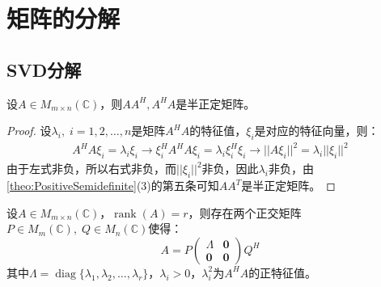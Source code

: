 \section{矩阵的分解}

\subsection{SVD分解}
\begin{theorem}\label{theo:AATPositiveSemidefinite}
	设$A\in M_{m\times n}(\mathbb{C})$，则$AA^H,A^HA$是半正定矩阵。
\end{theorem}
\begin{proof}
	设$\lambda_i,\;i=1,2,\dots,n$是矩阵$A^HA$的特征值，$\xi_i$是对应的特征向量，则：
	\begin{align*}
		A^HA\xi_i=\lambda_i\xi_i\rightarrow
		\xi_i^HA^HA\xi_i=\lambda_i\xi_i^H\xi_i\rightarrow
		||A\xi_i||^2=\lambda_i||\xi_i||^2
	\end{align*}
	由于左式非负，所以右式非负，而$||\xi_i||^2$非负，因此$\lambda_i$非负，由\cref{theo:PositiveSemidefinite}(3)的第五条可知$AA^T$是半正定矩阵。
\end{proof}
\begin{theorem}\label{theo:SVD}
	设$A\in M_{m\times n}(\mathbb{C})$，$\operatorname{rank}(A)=r$，则存在两个正交矩阵$P\in M_{m}(\mathbb{C}),\;Q\in M_{n}(\mathbb{C})$使得：
	\begin{equation*}
		A=P
		\begin{pmatrix}
			\varLambda & \mathbf{0} \\
			\mathbf{0} & \mathbf{0}
		\end{pmatrix}Q^H
	\end{equation*}
	其中$\varLambda=\operatorname{diag}\{\lambda_1,\lambda_2,\dots,\lambda_r\}$，$\lambda_i>0$，$\lambda_i^2$为$A^HA$的正特征值。
\end{theorem}
